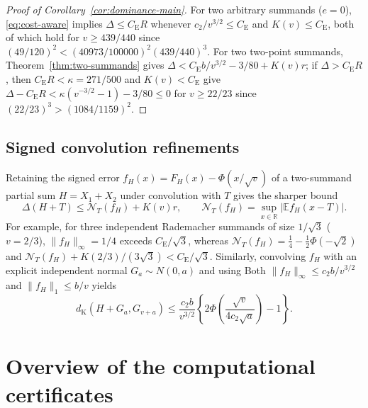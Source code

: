 \documentclass[11pt]{article}
\numberwithin{equation}{section}
\theoremstyle{definition}
\theoremstyle{remark}
\newcommand{\E}{\mathbb E}
\newcommand{\R}{\mathbb R}
\newcommand{\be}{C_{\mathrm E}}
\begin{document}
\begin{proof}[Proof of Corollary~\ref{cor:dominance-main}]
For two arbitrary summands ($e=0$), \eqref{eq:cost-aware} implies
$\Delta\le\be R$ whenever $c_2/v^{3/2}\le\be$ and $K(v)\le\be$, both of which
hold for $v\ge439/440$ since $(49/120)^2<(40973/100000)^2(439/440)^3$. For
two two-point summands, Theorem~\ref{thm:two-summands} gives
$\Delta<\be b/v^{3/2}-3/80+K(v)r$; if $\Delta>\be R$, then $\be R<\kappa=271/500$
and $K(v)<\be$ give $\Delta-\be R<\kappa(v^{-3/2}-1)-3/80\le0$ for
$v\ge22/23$ since $(22/23)^3>(1084/1159)^2$.
\end{proof}

\subsection{Signed convolution refinements}

Retaining the signed error $f_H(x)=F_H(x)-\Phi(x/\sqrt v)$ of a two-summand
partial sum $H=X_1+X_2$ under convolution with $T$ gives the sharper bound
\begin{equation}\label{eq:signed-convolution}
 \Delta(H+T)\le\mathcal N_T(f_H)+K(v)r,\qquad
 \mathcal N_T(f_H)=\sup_{x\in\R}|\E f_H(x-T)|.
\end{equation}
For example, for three independent Rademacher summands of size $1/\sqrt3$
($v=2/3$), $\|f_H\|_\infty=1/4$ exceeds $\be/\sqrt3$, whereas
$\mathcal N_T(f_H)=\frac14-\frac12\Phi(-\sqrt2)$ and
$\mathcal N_T(f_H)+K(2/3)/(3\sqrt3)<\be/\sqrt3$. Similarly, convolving $f_H$
with an explicit independent normal $G_a\sim N(0,a)$ and using Both
$\|f_H\|_\infty\le c_2b/v^{3/2}$ and $\|f_H\|_1\le b/v$
\citep{Goldstein2010,Tyurin2009} yields
\begin{equation}\label{eq:signed-gaussian}
 d_{\mathrm K}(H+G_a,G_{v+a})\le\frac{c_2b}{v^{3/2}}
 \left\{2\Phi\!\left(\frac{\sqrt v}{4c_2\sqrt a}\right)-1\right\}.
\end{equation}

\section{Overview of the computational certificates}\label{sec:verification}
\end{document}
